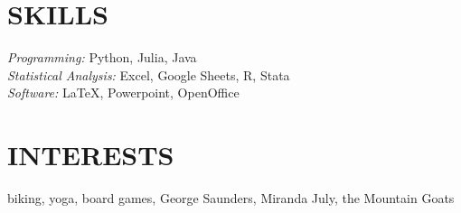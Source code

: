 \documentclass[margin, 10pt]{res} %
\begin{document}
\begin{resume}
%
%
%
%


\section{SKILLS} 

{\sl Programming:} 
Python, Julia, Java \\
{\sl Statistical Analysis:}
Excel, Google Sheets, R, Stata \\
{\sl Software:} 
LaTeX, Powerpoint, OpenOffice \\


\section{INTERESTS} 

biking, yoga, board games, George Saunders, Miranda July, the Mountain Goats


\end{resume}
\end{document}
